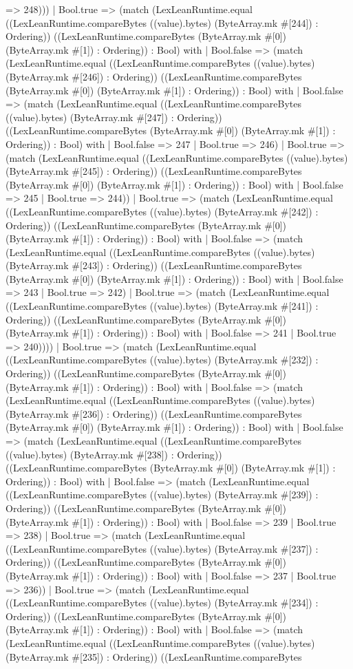 \documentclass[11pt]{article}
\begin{document}
=> 248))) | Bool.true => (match (LexLeanRuntime.equal ((LexLeanRuntime.compareBytes ((value).bytes) (ByteArray.mk \#[244]) : Ordering)) ((LexLeanRuntime.compareBytes (ByteArray.mk \#[0]) (ByteArray.mk \#[1]) : Ordering)) : Bool) with | Bool.false => (match (LexLeanRuntime.equal ((LexLeanRuntime.compareBytes ((value).bytes) (ByteArray.mk \#[246]) : Ordering)) ((LexLeanRuntime.compareBytes (ByteArray.mk \#[0]) (ByteArray.mk \#[1]) : Ordering)) : Bool) with | Bool.false => (match (LexLeanRuntime.equal ((LexLeanRuntime.compareBytes ((value).bytes) (ByteArray.mk \#[247]) : Ordering)) ((LexLeanRuntime.compareBytes (ByteArray.mk \#[0]) (ByteArray.mk \#[1]) : Ordering)) : Bool) with | Bool.false => 247 | Bool.true => 246) | Bool.true => (match (LexLeanRuntime.equal ((LexLeanRuntime.compareBytes ((value).bytes) (ByteArray.mk \#[245]) : Ordering)) ((LexLeanRuntime.compareBytes (ByteArray.mk \#[0]) (ByteArray.mk \#[1]) : Ordering)) : Bool) with | Bool.false => 245 | Bool.true => 244)) | Bool.true => (match (LexLeanRuntime.equal ((LexLeanRuntime.compareBytes ((value).bytes) (ByteArray.mk \#[242]) : Ordering)) ((LexLeanRuntime.compareBytes (ByteArray.mk \#[0]) (ByteArray.mk \#[1]) : Ordering)) : Bool) with | Bool.false => (match (LexLeanRuntime.equal ((LexLeanRuntime.compareBytes ((value).bytes) (ByteArray.mk \#[243]) : Ordering)) ((LexLeanRuntime.compareBytes (ByteArray.mk \#[0]) (ByteArray.mk \#[1]) : Ordering)) : Bool) with | Bool.false => 243 | Bool.true => 242) | Bool.true => (match (LexLeanRuntime.equal ((LexLeanRuntime.compareBytes ((value).bytes) (ByteArray.mk \#[241]) : Ordering)) ((LexLeanRuntime.compareBytes (ByteArray.mk \#[0]) (ByteArray.mk \#[1]) : Ordering)) : Bool) with | Bool.false => 241 | Bool.true => 240)))) | Bool.true => (match (LexLeanRuntime.equal ((LexLeanRuntime.compareBytes ((value).bytes) (ByteArray.mk \#[232]) : Ordering)) ((LexLeanRuntime.compareBytes (ByteArray.mk \#[0]) (ByteArray.mk \#[1]) : Ordering)) : Bool) with | Bool.false => (match (LexLeanRuntime.equal ((LexLeanRuntime.compareBytes ((value).bytes) (ByteArray.mk \#[236]) : Ordering)) ((LexLeanRuntime.compareBytes (ByteArray.mk \#[0]) (ByteArray.mk \#[1]) : Ordering)) : Bool) with | Bool.false => (match (LexLeanRuntime.equal ((LexLeanRuntime.compareBytes ((value).bytes) (ByteArray.mk \#[238]) : Ordering)) ((LexLeanRuntime.compareBytes (ByteArray.mk \#[0]) (ByteArray.mk \#[1]) : Ordering)) : Bool) with | Bool.false => (match (LexLeanRuntime.equal ((LexLeanRuntime.compareBytes ((value).bytes) (ByteArray.mk \#[239]) : Ordering)) ((LexLeanRuntime.compareBytes (ByteArray.mk \#[0]) (ByteArray.mk \#[1]) : Ordering)) : Bool) with | Bool.false => 239 | Bool.true => 238) | Bool.true => (match (LexLeanRuntime.equal ((LexLeanRuntime.compareBytes ((value).bytes) (ByteArray.mk \#[237]) : Ordering)) ((LexLeanRuntime.compareBytes (ByteArray.mk \#[0]) (ByteArray.mk \#[1]) : Ordering)) : Bool) with | Bool.false => 237 | Bool.true => 236)) | Bool.true => (match (LexLeanRuntime.equal ((LexLeanRuntime.compareBytes ((value).bytes) (ByteArray.mk \#[234]) : Ordering)) ((LexLeanRuntime.compareBytes (ByteArray.mk \#[0]) (ByteArray.mk \#[1]) : Ordering)) : Bool) with | Bool.false => (match (LexLeanRuntime.equal ((LexLeanRuntime.compareBytes ((value).bytes) (ByteArray.mk \#[235]) : Ordering)) ((LexLeanRuntime.compareBytes 
\end{document}
